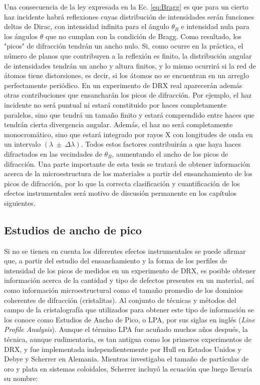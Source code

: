 Una consecuencia de la ley expresada en la Ec. \ref{eq:Bragg} es que para un cierto haz incidente habrá reflexiones cuyas distribución de intensidades serán funciones deltas de Dirac, con intensidad infinita para el ángulo $\theta_{B}$ e intensidad nula para los ángulos $\theta$ que no cumplan con la condición de Bragg. 
Como resultado, los "picos" de difracción tendrán un ancho nulo. 
Si, como ocurre en la práctica, el número de planos que contribuyen a la reflexión es finito, la distribución angular de intensidades tendrán un ancho y altura finitos, y lo mismo ocurrirá si la red de átomos tiene distorsiones, es decir, si los átomos no se encuentran en un arreglo perfectamente periódico.
En un experimento de DRX real aparecerán además otras contribuciones que ensancharán los picos de difracción. 
Por ejemplo, el haz incidente no será puntual ni estará constituido por haces completamente paralelos, sino que tendrá un tamaño finito y estará comprendido entre haces que tendrán cierta divergencia angular.
Además, el haz no será completamente monocromático, sino que estará integrado por rayos X con longitudes de onda en un intervalo $(\lambda \ \pm \ \Delta \lambda)$.
Todos estos factores contribuirán a que haya haces difractados en las vecindades de $\theta_{B}$, aumentando el ancho de los picos de difracción. 
Una parte importante de esta tesis se tratará de obtener información acerca de la microestructura de los materiales a partir del ensanchamiento de los picos de difracción, por lo que la correcta clasificación y cuantificación de los efectos instrumentales será motivo de discusión permanente en los capítulos siguientes.

\subsection{Estudios de ancho de pico}\label{SS:DRX-LPA} 
Si no se tienen en cuenta los diferentes efectos instrumentales se puede afirmar que, a partir del estudio del ensanchamiento y la forma de los perfiles de intensidad de los picos de medidos en un experimento de DRX, es posible obtener información acerca de la cantidad y tipo de defectos presentes en un material, así como información microestructural como el tamaño promedio de los dominios coherentes de difracción (cristalitas).
Al conjunto de técnicas y métodos del campo de la cristalografía que utilizados para obtener este tipo de información se los conoce como Estudios de Ancho de Pico, o LPA, por sus siglas en inglés (\textit{Line Profile Analysis}).
Aunque el término LPA fue acuñado muchos años después, la técnica, aunque rudimentaria, es tan antigua como los primeros experimentos de DRX, y fue implementada independientemente por Hull en Estados Unidos y Debye y Scherrer en Alemania. Mientras investigaba el tamaño de partículas de oro y plata en sistemas coloidales, Scherrer incluyó la ecuación que luego llevaría su nombre\cite{Scherrer1918}:


